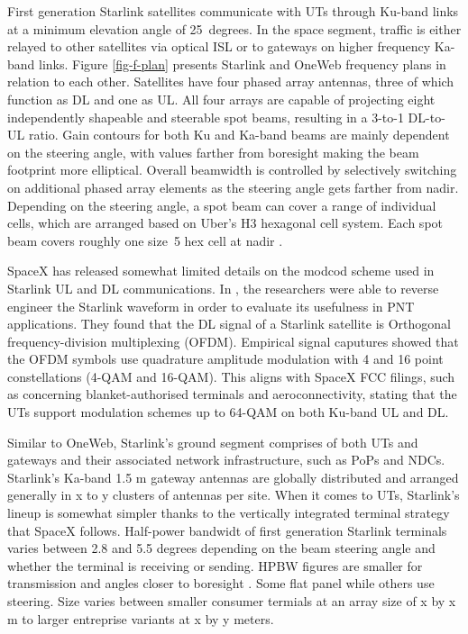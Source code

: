\documentclass[english, 12pt, a4paper, elec, utf8, a-1b, online]{aaltothesis}
\begin{document}
First generation Starlink satellites communicate with UTs through Ku-band links at a minimum elevation angle of 25~degrees.
In the space segment, traffic is either relayed to other satellites via optical ISL or to gateways on higher frequency Ka-band links.
Figure \ref{fig-f-plan} presents Starlink and OneWeb frequency plans in relation to each other.
Satellites have four phased array antennas, three of which function as DL and one as UL.
All four arrays are capable of projecting eight independently shapeable and steerable spot beams, resulting in a 3-to-1 DL-to-UL ratio.
Gain contours for both Ku and Ka-band beams are mainly dependent on the steering angle, with values farther from boresight making the beam footprint more elliptical.
Overall beamwidth is controlled by selectively switching on additional phased array elements as the steering angle gets farther from nadir. Depending on the steering angle, a spot beam can cover a range of individual cells, which are arranged based on Uber's H3 hexagonal cell system. Each spot beam covers roughly one size~5 hex cell at nadir \cite{spacex2016loa, spacex2020mod}. %

SpaceX has released somewhat limited details on the modcod scheme used in Starlink UL and DL communications. In \cite{humphreys2023signal}, the researchers were able to reverse engineer the Starlink waveform in order to evaluate its usefulness in PNT applications. They found that the DL signal of a Starlink satellite is Orthogonal frequency-division multiplexing (OFDM). Empirical signal caputures showed that the OFDM symbols use quadrature amplitude modulation with 4 and 16 point constellations (4-QAM and 16-QAM). This aligns with SpaceX FCC filings, such as \cite{SpaceX-SES-AMD-20210731-01295} concerning blanket-authorised terminals and aeroconnectivity, stating that the UTs support modulation schemes up to 64-QAM on both Ku-band UL and DL.

Similar to OneWeb, Starlink's ground segment comprises of both UTs and gateways and their associated network infrastructure, such as PoPs and NDCs. Starlink's Ka-band 1.5 m gateway antennas are globally distributed and arranged generally in x to y clusters of antennas per site. %
When it comes to UTs, Starlink's lineup is somewhat simpler thanks to the vertically integrated terminal strategy that SpaceX follows.
Half-power bandwidt of first generation Starlink terminals varies between 2.8 and 5.5 degrees depending on the beam steering angle and whether the terminal is receiving or sending. HPBW figures are smaller for transmission and angles closer to boresight \cite{SpaceX-SES-AMD-20210731-01295}. Some flat panel while others use steering. Size varies between smaller consumer termials at an array size of x by x m to larger entreprise variants at x by y meters. %
\end{document}
